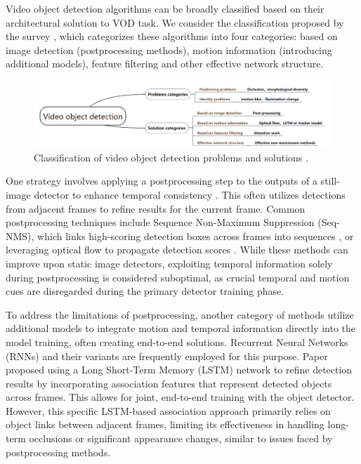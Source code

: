 Video object detection algorithms can be broadly classified based on their architectural solution to VOD task. We consider the classification proposed by the survey \cite{jiaoNewGenerationDeep2022}, which categorizes these algorithms into four categories: based on image detection (postprocessing methods), motion information (introducing additional models), feature filtering and other effective network structure.

\begin{figure}
    \centering
    \includegraphics[width=\textwidth]{figures/figure_background_vod_classification.png}
    \caption{Classification of video object detection problems and solutions \cite{jiaoNewGenerationDeep2022}.}
    \label{fig:figure_background_vod_classification}
\end{figure}


One strategy involves applying a postprocessing step to the outputs of a still-image detector to enhance temporal consistency \cite{hanSeqNMSVideoObject2016, kangTCNNTubeletsConvolutional2018, kangObjectDetectionVideo2016}. This often utilizes detections from adjacent frames to refine results for the current frame. Common postprocessing techniques include Sequence Non-Maximum Suppression (Seq-NMS), which links high-scoring detection boxes across frames into sequences \cite{hanSeqNMSVideoObject2016}, or leveraging optical flow to propagate detection scores \cite{kangTCNNTubeletsConvolutional2018, kangObjectDetectionVideo2016}. While these methods can improve upon static image detectors, exploiting temporal information solely during postprocessing is considered suboptimal, as crucial temporal and motion cues are disregarded during the primary detector training phase.

To address the limitations of postprocessing, another category of methods utilize additional models to integrate motion and temporal information directly into the model training, often creating end-to-end solutions. Recurrent Neural Networks (RNNs) and their variants are frequently employed for this purpose. Paper \cite{Lu_2017_ICCV} proposed using a Long Short-Term Memory (LSTM) network \cite{6795963} to refine detection results by incorporating association features that represent detected objects across frames. This allows for joint, end-to-end training with the object detector. However, this specific LSTM-based association approach primarily relies on object links between adjacent frames, limiting its effectiveness in handling long-term occlusions or significant appearance changes, similar to issues faced by postprocessing methods.

